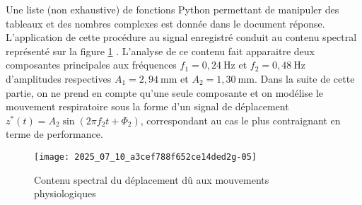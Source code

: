 \ifprof
\else

Une liste (non exhaustive) de fonctions Python permettant de manipuler des tableaux et des nombres complexes est donnée dans le document réponse.\\
L'application de cette procédure au signal enregistré conduit au contenu spectral représenté sur la figure \ref{ccs_psi_2019_fig_05} . L'analyse de ce contenu fait apparaitre deux composantes principales aux fréquences $f_{1}=0,24 \mathrm{~Hz}$ et $f_{2}=0,48 \mathrm{~Hz}$ d'amplitudes respectives $A_{1}=2,94 \mathrm{~mm}$ et $A_{2}=1,30 \mathrm{~mm}$. Dans la suite de cette partie, on ne prend en compte qu'une seule composante et on modélise le mouvement respiratoire sous la forme d'un signal de déplacement $z^{*}(t)=A_{2} \sin \left(2 \pi f_{2} t+\Phi_{2}\right)$, correspondant au cas le plus contraignant en terme de performance.


\begin{figure}[!h]
\centering
\texttt{[image: 2025\_07\_10\_a3cef788f652ce14ded2g-05]}

\caption{Contenu spectral du déplacement dû aux mouvements physiologiques\label{ccs_psi_2019_fig_05}}
\end{figure}


\fi

